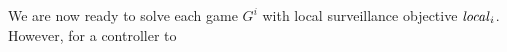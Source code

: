 We are now ready to solve each game $G^i$ with local surveillance objective $\mathit{local}_i$. However, for a controller to 